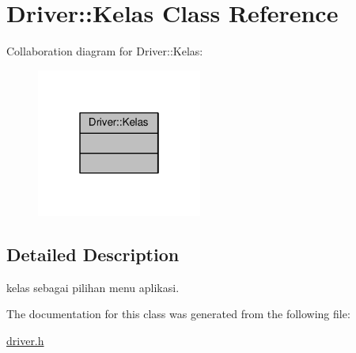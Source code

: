 \hypertarget{classDriver_1_1Kelas}{}\section{Driver\+:\+:Kelas Class Reference}
\label{classDriver_1_1Kelas}


Collaboration diagram for Driver\+:\+:Kelas\+:
\nopagebreak
\begin{figure}[H]
\begin{center}
\leavevmode
\includegraphics[width=154pt]{classDriver_1_1Kelas__coll__graph}
\end{center}
\end{figure}


\subsection{Detailed Description}
kelas sebagai pilihan menu aplikasi. 

The documentation for this class was generated from the following file\+:\begin{DoxyCompactItemize}
\item 
\hyperlink{driver_8h}{driver.\+h}\end{DoxyCompactItemize}
